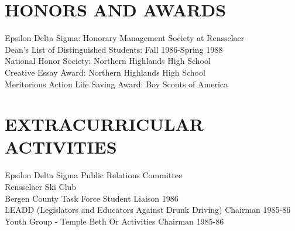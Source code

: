 \documentclass{res}
\begin{document}
\begin{resume}
\section{HONORS AND AWARDS}
    Epsilon Delta Sigma: Honorary Management Society at
    Rensselaer    \\
    Dean's List of Distinguished Students: Fall 1986-Spring 1988  \\
    National Honor Society: Northern Highlands High School  \\
    Creative Essay Award: Northern Highlands High School  \\
    Meritorious Action Life Saving Award: Boy Scouts of America

\section{EXTRACURRICULAR ACTIVITIES}
    Epsilon Delta Sigma Public Relations Committee \\
    Rensselaer Ski Club     \\
    Bergen County Task Force Student Liaison 1986  \\
    LEADD (Legislators and Educators Against Drunk Driving) Chairman
     1985-86  \\
    Youth Group - Temple Beth Or Activities Chairman 1985-86

\end{resume}
\end{document}
